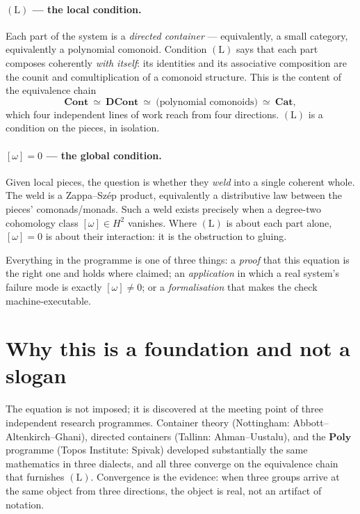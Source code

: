 \documentclass[11pt]{report}
\theoremstyle{plain}
\theoremstyle{definition}
\theoremstyle{remark}
\newcommand{\Cont}{\mathbf{Cont}}
\newcommand{\DCont}{\mathbf{DCont}}
\newcommand{\Cat}{\mathbf{Cat}}
\newcommand{\Poly}{\mathbf{Poly}}
\newcommand{\Hcoh}{H^2}
\begin{document}
\paragraph{$(\mathrm{L})$ --- the local condition.}
Each part of the system is a \emph{directed container} --- equivalently, a small
category, equivalently a polynomial comonoid. Condition $(\mathrm{L})$ says that
each part composes coherently \emph{with itself}: its identities and its
associative composition are the counit and comultiplication of a comonoid
structure. This is the content of the equivalence chain
\[
   \Cont \ \simeq\ \DCont \ \simeq\ \text{(polynomial comonoids)}\ \simeq\ \Cat,
\]
which four independent lines of work reach from four directions. $(\mathrm{L})$
is a condition on the pieces, in isolation.

\paragraph{$[\omega]=0$ --- the global condition.}
Given local pieces, the question is whether they \emph{weld} into a single
coherent whole. The weld is a Zappa--Sz\'ep product, equivalently a distributive
law between the pieces' comonads/monads. Such a weld exists precisely when a
degree-two cohomology class $[\omega]\in \Hcoh$ vanishes. Where $(\mathrm{L})$
is about each part alone, $[\omega]=0$ is about their interaction: it is the
obstruction to gluing.

Everything in the programme is one of three things: a \emph{proof} that this
equation is the right one and holds where claimed; an \emph{application} in
which a real system's failure mode is exactly $[\omega]\neq 0$; or a
\emph{formalisation} that makes the check machine-executable.

\section{Why this is a foundation and not a slogan}

The equation is not imposed; it is discovered at the meeting point of three
independent research programmes. Container theory (Nottingham:
Abbott--Altenkirch--Ghani), directed containers (Tallinn: Ahman--Uustalu), and
the $\Poly$ programme (Topos Institute: Spivak) developed substantially the same
mathematics in three dialects, and all three converge on the equivalence chain
that furnishes $(\mathrm{L})$. Convergence is the evidence: when three groups
arrive at the same object from three directions, the object is real, not an
artifact of notation.
\end{document}
